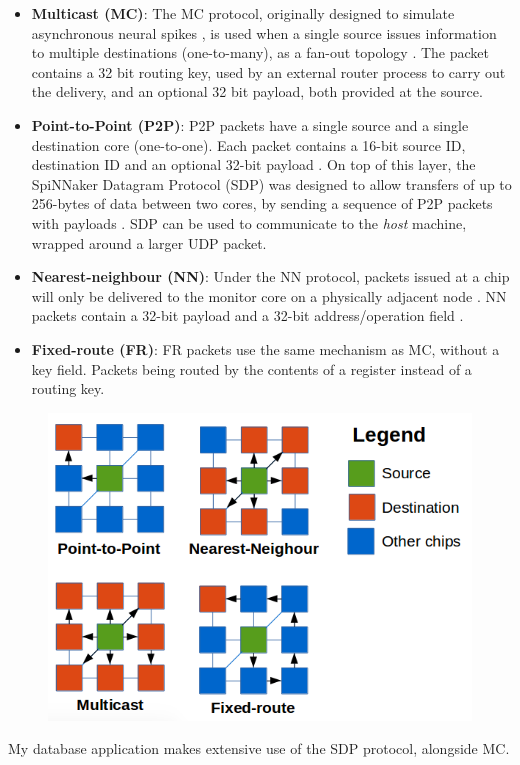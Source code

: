 \begin{itemize}
\item \textbf{Multicast (MC)}: The MC protocol, originally designed to simulate asynchronous neural spikes \cite{multicastpaper}, is used when a single source issues information to multiple destinations (one-to-many), as a fan-out topology \cite{overviewspinn}. The packet contains a 32 bit routing key, used by an external router process to carry out the delivery, and an optional 32 bit payload, both provided at the source.

\item \textbf{Point-to-Point (P2P)}: P2P packets have a single source and a single destination core (one-to-one). Each packet contains a 16-bit source ID, destination ID and an optional 32-bit payload \cite{datasheet}.
On top of this layer, the SpiNNaker Datagram Protocol (SDP) was designed to allow transfers of up to 256-bytes of data between two cores, by sending a sequence of P2P packets with payloads \cite{sdp}. SDP can be used to communicate to the \textit{host} machine, wrapped around a larger UDP packet.

\item \textbf{Nearest-neighbour (NN)}: Under the NN protocol, packets issued at a chip will only be delivered to the monitor core on a physically adjacent node \cite{overviewspinn}. NN packets contain a 32-bit payload and a 32-bit address/operation field \cite{datasheet}.

\item \textbf{Fixed-route (FR)}: FR packets use the same mechanism as MC, without a key field. Packets being routed by the contents of a register instead of a routing key. 
\end{itemize}

\begin{figure}
  \centering
  \includegraphics[width=1\linewidth, natwidth=578, natheight=420]{images/packet_types.png}
  \label{fig:comm_protocols}
\end{figure}

My database application makes extensive use of the SDP protocol, alongside MC.